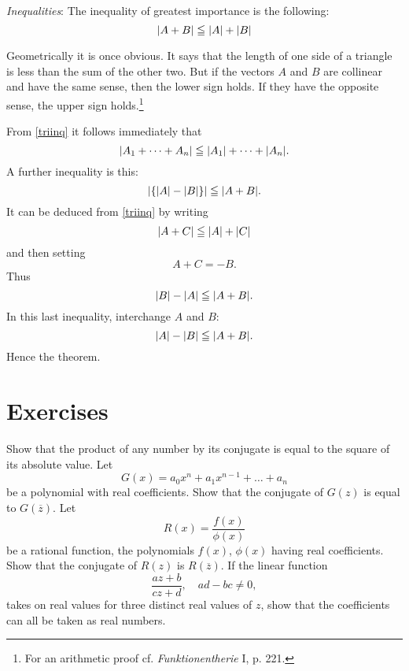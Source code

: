 \emph{Inequalities}: The inequality of greatest importance is the following:
\begin{equation}\label{triinq}
	\abs*{A+B} \le \abs*{A} +\abs*{B} 
\end{equation} 


\begin{wrapfigure}{R}{0.3\textwidth}
\centering
{}
\end{wrapfigure}
Geometrically it is once obvious. It says that the length of one side of a triangle is less than the sum of the other two. But if the vectors $A$ and $B$ are collinear and have the same sense, then the lower sign holds. If they have the opposite sense, the upper sign holds.\footnote{For an arithmetic proof cf. \emph{Funktionentherie} I, p. 221.}

From \ref{triinq} it follows immediately that
\begin{equation}
	\abs*{A_1+\dots +A_n} \le \abs*{A_1} +\dots +\abs*{A_n}.
\end{equation}
A further inequality is this:
\[
	\abs*{\cbr*{\abs*{A} -\abs*{B} } } \le \abs*{A+B} 
.\] It can be deduced from \ref{triinq} by writing
\[
	\abs*{A+C} \le \abs*{A} +\abs*{C} 
\] and then setting
\[
A+C=-B
.\] Thus
\[
	\abs*{B} -\abs*{A}\le \abs*{A+B} 
.\] In this last inequality, interchange $A$ and $B$:
\[
	\abs*{A} -\abs*{B} \le \abs*{A+B} 
.\] Hence the theorem.

\section*{Exercises}
\problem Show that the product of any number by its conjugate is equal to the square of its absolute value.
\problem Let
	\[
		G(x)=a_0x^n+a_1x^{n-1}+\dots +a_n
	\] be a polynomial with real coefficients. Show that the conjugate of $G(z)$ is equal to $G(\overline{z})$. 
\problem Let
	\[
		R(x)=\frac{f(x)}{\phi(x)} 
	\] be a rational function, the polynomials $f(x)$, $\phi (x)$ having real coefficients. Show that the conjugate of $R(z)$ is $R(\overline{z})$.
\problem If the linear function
	\[
	\frac{az+b}{cz+d} ,\quad ad-bc\neq 0
	,\] takes on real values for three distinct real values of $z$, show that the coefficients can all be taken as real numbers. 


